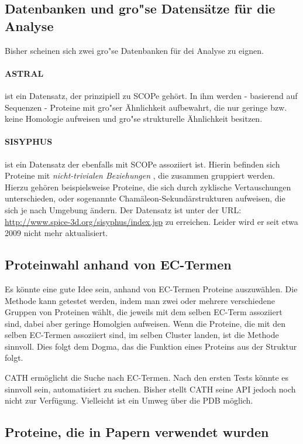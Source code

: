 \documentclass{article}
\begin{document}
\subsection{Datenbanken und gro"se Datens\"atze f\"ur die Analyse}

Bisher scheinen sich zwei gro"se Datenbanken f\"ur dei Analyse zu eignen.

\paragraph{ASTRAL} ist ein Datensatz, der prinzipiell zu SCOPe geh\"ort. In ihm werden - basierend auf Sequenzen - Proteine mit gro"ser \"Ahnlichkeit aufbewahrt, die nur geringe bzw. keine Homologie aufweisen und gro"se strukturelle \"Ahnlichkeit besitzen.

\paragraph{SISYPHUS} ist ein Datensatz der ebenfalls mit SCOPe assoziiert ist.
Hierin befinden sich Proteine mit \textit{nicht-trivialen Beziehungen} , die zusammen gruppiert werden.
Hierzu geh\"oren beispielsweise Proteine, die sich durch zyklische Vertauschungen unterschieden, oder sogenannte Cham\"aleon-Sekund\"arstrukturen aufweisen, die sich je nach Umgebung \"andern.
Der Datensatz ist unter der URL:
\url{http://www.spice-3d.org/sisyphus/index.jsp} zu erreichen.
Leider wird er seit etwa 2009 nicht mehr aktualisiert. 

\subsection{Proteinwahl anhand von EC-Termen}
Es k\"onnte eine gute Idee sein, anhand von EC-Termen Proteine auszuw\"ahlen. Die Methode kann getestet werden, indem man zwei oder mehrere verschiedene Gruppen von Proteinen w\"ahlt, die jeweils mit dem selben EC-Term assoziiert sind, dabei aber geringe Homolgien aufweisen.
Wenn die Proteine, die mit den selben EC-Termen assoziiert sind, im selben Cluster landen, ist die Methode sinnvoll. Dies folgt dem Dogma, das die Funktion eines Proteins aus der Struktur folgt.

CATH erm\"oglicht die Suche nach EC-Termen. Nach den ersten Tests k\"onnte es sinnvoll sein, automatisiert zu suchen. Bisher stellt CATH seine API jedoch noch nicht zur Verf\"ugung. Vielleicht ist ein Umweg \"uber die PDB m\"oglich.

\subsection{Proteine, die in Papern verwendet wurden}
\end{document}
